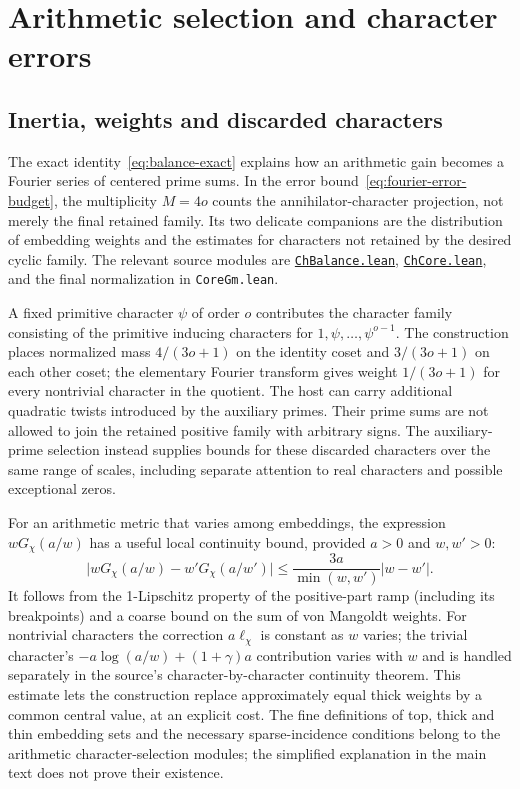 \documentclass[11pt,openany,oneside]{scrbook}
\theoremstyle{definition}
\theoremstyle{remark}
\newcommand{\baseurl}{https://github.com/CocoSgt/riemann-hypothesis-lean/blob/7cbf7a0c32fca1badf05931879a37c3f8a2b03b4/}
\newcommand{\sourcefile}[2]{\href{\baseurl#1}{\texttt{#2}}}
\begin{document}
\chapter{Arithmetic selection and character errors}\label{app:selection}

\section{Inertia, weights and discarded characters}\label{app:fourier-technical}

The exact identity~\eqref{eq:balance-exact} explains how an arithmetic gain becomes a Fourier series of centered prime sums. In the error bound~\eqref{eq:fourier-error-budget}, the multiplicity $M=4o$ counts the annihilator-character projection, not merely the final retained family. Its two delicate companions are the distribution of embedding weights and the estimates for characters not retained by the desired cyclic family.  The relevant source modules are
\sourcefile{src/Development/AutomorphicArithmetic/DedekindLFunctions/LandauTheorems/ChBalance.lean}{ChBalance.lean}, \sourcefile{src/Development/AutomorphicArithmetic/DedekindLFunctions/LandauTheorems/ChCore.lean}{ChCore.lean}, and the final normalization in \texttt{CoreGm.lean}.

A fixed primitive character $\psi$ of order $o$ contributes the character family consisting of the primitive inducing characters for $1,\psi,\ldots,\psi^{o-1}$.  The construction places normalized mass $4/(3o+1)$ on the identity coset and $3/(3o+1)$ on each other coset; the elementary Fourier transform gives weight $1/(3o+1)$ for every nontrivial character in the quotient.  The host can carry additional quadratic twists introduced by the auxiliary primes.  Their prime sums are not allowed to join the retained positive family with arbitrary signs.  The auxiliary-prime selection instead supplies bounds for these discarded characters over the same range of scales, including separate attention to real characters and possible exceptional zeros.

For an arithmetic metric that varies among embeddings, the expression $wG_\chi(a/w)$ has a useful local continuity bound, provided $a>0$ and $w,w'>0$:
\[
\bigl|wG_\chi(a/w)-w'G_\chi(a/w')\bigr|
\le\frac{3a}{\min(w,w')}|w-w'|.
\]
It follows from the 1-Lipschitz property of the positive-part ramp (including its breakpoints) and a coarse bound on the sum of von Mangoldt weights. For nontrivial characters the correction $a\ell_\chi$ is constant as $w$ varies; the trivial character's $-a\log(a/w)+(1+\gamma)a$ contribution varies with $w$ and is handled separately in the source's character-by-character continuity theorem.  This estimate lets the construction replace approximately equal thick weights by a common central value, at an explicit cost.  The fine definitions of top, thick and thin embedding sets and the necessary sparse-incidence conditions belong to the arithmetic character-selection modules; the simplified explanation in the main text does not prove their existence.
\end{document}
